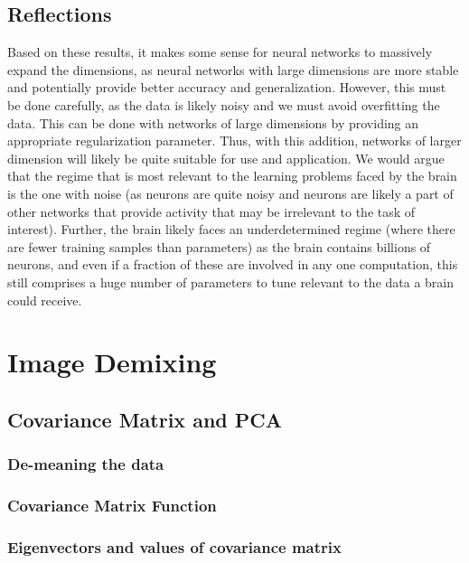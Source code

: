 \documentclass[11pt, oneside]{article}
\begin{document}
\subsection{Reflections}

Based on these results, it makes some sense for neural networks to massively expand the dimensions, as neural networks with large dimensions are more stable and potentially provide better accuracy and generalization. However, this must be done carefully, as the data is likely noisy and we must avoid overfitting the data. This can be done with networks of large dimensions by providing an appropriate regularization parameter. Thus, with this addition, networks of larger dimension will likely be quite suitable for use and application. We would argue that the regime that is most relevant to the learning problems faced by the brain is the one with noise (as neurons are quite noisy and neurons are likely a part of other networks that provide activity that may be irrelevant to the task of interest). Further, the brain likely faces an underdetermined regime (where there are fewer training samples than parameters) as the brain contains billions of neurons, and even if a fraction of these are involved in any one computation, this still comprises a huge number of parameters to tune relevant to the data a brain could receive.

\section{Image Demixing}

\subsection{Covariance Matrix and PCA}

\subsubsection{De-meaning the data}

\subsubsection{Covariance Matrix Function}

\subsubsection{Eigenvectors and values of covariance matrix}
\end{document}
